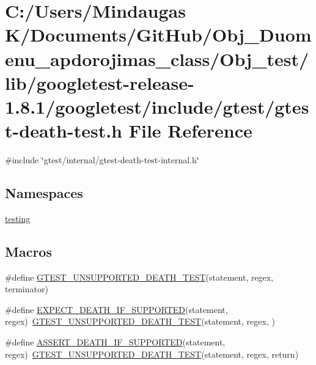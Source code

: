 \hypertarget{_obj__test_2lib_2googletest-release-1_88_81_2googletest_2include_2gtest_2gtest-death-test_8h}{}\section{C\+:/\+Users/\+Mindaugas K/\+Documents/\+Git\+Hub/\+Obj\+\_\+\+Duomenu\+\_\+apdorojimas\+\_\+class/\+Obj\+\_\+test/lib/googletest-\/release-\/1.8.1/googletest/include/gtest/gtest-\/death-\/test.h File Reference}
\label{_obj__test_2lib_2googletest-release-1_88_81_2googletest_2include_2gtest_2gtest-death-test_8h}
{\ttfamily \#include \char`\"{}gtest/internal/gtest-\/death-\/test-\/internal.\+h\char`\"{}}\newline
\subsection*{Namespaces}
\begin{DoxyCompactItemize}
\item 
 \mbox{\hyperlink{namespacetesting}{testing}}
\end{DoxyCompactItemize}
\subsection*{Macros}
\begin{DoxyCompactItemize}
\item 
\#define \mbox{\hyperlink{_obj__test_2lib_2googletest-release-1_88_81_2googletest_2include_2gtest_2gtest-death-test_8h_aa5f42ab29859b7f49a901770d2e66855}{G\+T\+E\+S\+T\+\_\+\+U\+N\+S\+U\+P\+P\+O\+R\+T\+E\+D\+\_\+\+D\+E\+A\+T\+H\+\_\+\+T\+E\+ST}}(statement,  regex,  terminator)
\item 
\#define \mbox{\hyperlink{_obj__test_2lib_2googletest-release-1_88_81_2googletest_2include_2gtest_2gtest-death-test_8h_a8564de0e012dd0898949c513d1571f8b}{E\+X\+P\+E\+C\+T\+\_\+\+D\+E\+A\+T\+H\+\_\+\+I\+F\+\_\+\+S\+U\+P\+P\+O\+R\+T\+ED}}(statement,  regex)~\mbox{\hyperlink{_obj__test_2lib_2googletest-release-1_88_81_2googletest_2include_2gtest_2gtest-death-test_8h_aa5f42ab29859b7f49a901770d2e66855}{G\+T\+E\+S\+T\+\_\+\+U\+N\+S\+U\+P\+P\+O\+R\+T\+E\+D\+\_\+\+D\+E\+A\+T\+H\+\_\+\+T\+E\+ST}}(statement, regex, )
\item 
\#define \mbox{\hyperlink{_obj__test_2lib_2googletest-release-1_88_81_2googletest_2include_2gtest_2gtest-death-test_8h_ab2f0f25b46353767179a49ebd15b7345}{A\+S\+S\+E\+R\+T\+\_\+\+D\+E\+A\+T\+H\+\_\+\+I\+F\+\_\+\+S\+U\+P\+P\+O\+R\+T\+ED}}(statement,  regex)~\mbox{\hyperlink{_obj__test_2lib_2googletest-release-1_88_81_2googletest_2include_2gtest_2gtest-death-test_8h_aa5f42ab29859b7f49a901770d2e66855}{G\+T\+E\+S\+T\+\_\+\+U\+N\+S\+U\+P\+P\+O\+R\+T\+E\+D\+\_\+\+D\+E\+A\+T\+H\+\_\+\+T\+E\+ST}}(statement, regex, return)
\end{DoxyCompactItemize}
